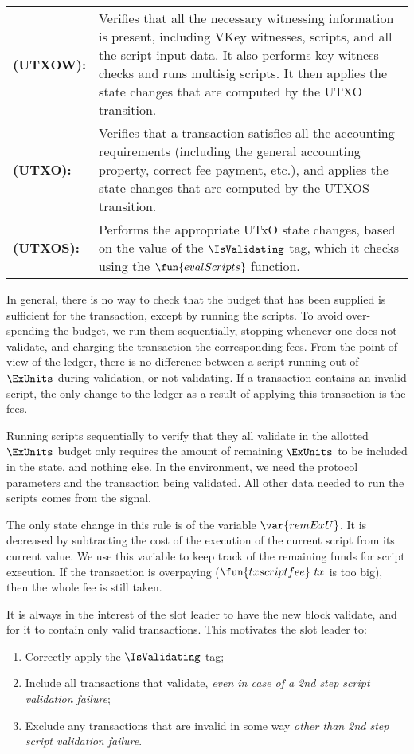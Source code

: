 \begin{tabular}{lp{12cm}}
  \textbf{(UTXOW):} & Verifies that all the necessary witnessing information is present, including
  VKey witnesses, scripts, and all the script input data. It also performs
  key witness checks and runs multisig scripts. It then applies the state changes that are
  computed by the UTXO transition.
  \\
  \textbf{(UTXO):} & Verifies that a transaction satisfies all the accounting requirements
  (including the general accounting property, correct fee payment, etc.),
  and applies the state changes that are computed by the UTXOS transition.
  \\
  \textbf{(UTXOS):} & Performs the appropriate UTxO state changes, based on the
  value of the $\IsValidating$ tag, which it checks using the $\fun{evalScripts}$ function.
\end{tabular}

In general, there is no way to check that the budget that has been supplied is sufficient for the transaction,
except by running the scripts. To avoid over-spending the budget, we run them sequentially,
stopping whenever one does not validate, and charging the transaction the corresponding
fees. From the point of view of the ledger, there is no difference
between a script running out of $\ExUnits$ during validation, or not validating.
If a transaction contains an invalid script, the only change to the ledger
as a result of applying this transaction is the fees.

Running scripts sequentially
to verify that they all validate in the allotted $\ExUnits$ budget only requires
the amount of remaining $\ExUnits$ to be included in the state, and nothing else.
In the environment, we need the protocol parameters and the
transaction being validated. All other data needed
to run the scripts comes from the signal.

The only state change in this rule is of the variable $\var{remExU}$.
It is decreased by subtracting the cost of the execution of the
current script from its current value.
We use this variable to keep track of the remaining funds for
script execution. If the transaction is overpaying ($\fun{txscriptfee}~{tx}$
is too big), then the whole fee is still taken.

It is always in the interest of the slot leader to have the new block validate,
and for it to contain only valid transactions. This motivates the
slot leader to:

\begin{enumerate}
  \item Correctly apply the $\IsValidating$ tag;
  \item Include all transactions that validate,
  \textit{even in case of a 2nd step script validation failure};
  \item Exclude any transactions that are invalid in some way \textit{other than 2nd step script validation failure}.
\end{enumerate}

